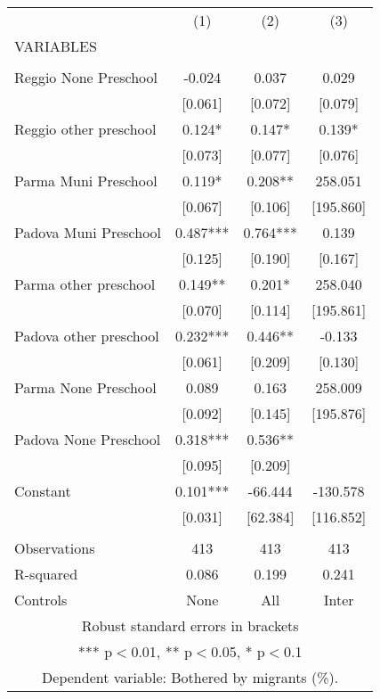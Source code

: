 \begin{tabular}{lccc} \hline
 & (1) & (2) & (3) \\
VARIABLES &  &  &  \\ \hline
 &  &  &  \\
Reggio None Preschool & -0.024 & 0.037 & 0.029 \\
 & [0.061] & [0.072] & [0.079] \\
Reggio other preschool & 0.124* & 0.147* & 0.139* \\
 & [0.073] & [0.077] & [0.076] \\
Parma Muni Preschool & 0.119* & 0.208** & 258.051 \\
 & [0.067] & [0.106] & [195.860] \\
Padova Muni Preschool & 0.487*** & 0.764*** & 0.139 \\
 & [0.125] & [0.190] & [0.167] \\
Parma other preschool & 0.149** & 0.201* & 258.040 \\
 & [0.070] & [0.114] & [195.861] \\
Padova other preschool & 0.232*** & 0.446** & -0.133 \\
 & [0.061] & [0.209] & [0.130] \\
Parma None Preschool & 0.089 & 0.163 & 258.009 \\
 & [0.092] & [0.145] & [195.876] \\
Padova None Preschool & 0.318*** & 0.536** &  \\
 & [0.095] & [0.209] &  \\
Constant & 0.101*** & -66.444 & -130.578 \\
 & [0.031] & [62.384] & [116.852] \\
 &  &  &  \\
Observations & 413 & 413 & 413 \\
R-squared & 0.086 & 0.199 & 0.241 \\
 Controls & None & All & Inter \\ \hline
\multicolumn{4}{c}{ Robust standard errors in brackets} \\
\multicolumn{4}{c}{ *** p$<$0.01, ** p$<$0.05, * p$<$0.1} \\
\multicolumn{4}{c}{ Dependent variable: Bothered by migrants (\%).} \\
\end{tabular}
